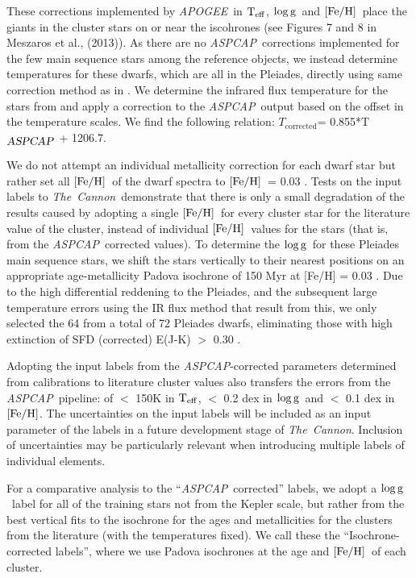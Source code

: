 \documentclass[12pt, preprint]{aastex}
\newcommand{\teff}{\mbox{$\rm T_{eff}$}}
\newcommand{\feh}{\mbox{$\rm [Fe/H]$}}
\newcommand{\logg}{\mbox{$\rm \log g$}}
\newcommand{\tc}{\textsl{The~Cannon}}
\newcommand{\apogee}{\textsl{APOGEE}}
\newcommand{\aspcap}{\textsl{ASPCAP}}
\begin{document}
These corrections implemented by \apogee\ in \teff, \logg\ and  \feh\ place the giants in the cluster stars on or near the iscohrones (see Figures 7 and 8 in Meszaros et al., (2013)).  
As there are no \aspcap\ corrections implemented for the few main sequence stars among the reference objects, 
we instead determine temperatures for these dwarfs, which are all in the Pleiades, directly using same correction method 
as in \citet{Meszaros2013}. 
We determine the infrared flux temperature for the stars from \citet{gonzalez2009} and apply a correction to 
the \aspcap\ output based on the offset in the temperature scales. We find the following relation:
 $T_{\mbox{corrected}}$= 0.855*T$_{\mbox{\textit{\aspcap}}}$ + 1206.7.


We do not attempt an individual metallicity correction for each dwarf star but rather set all \feh\ of the dwarf spectra to \feh\ = 0.03 \citep{barrado2001}.
Tests on the input labels to \tc\ demonstrate that there is only a small degradation of the results caused by adopting a single \feh\ for every cluster star for the literature value of the cluster, instead of individual \feh\ values for the stars (that is, from the \aspcap\ corrected values). 
To determine the \logg\ for these Pleiades main sequence stars, we shift the stars vertically to their nearest positions on an appropriate age-metallicity Padova isochrone of 150 Myr at [Fe/H] = 0.03 \citep{girardi2000}. 
Due to the high differential reddening to the Pleiades, and the subsequent large temperature errors using the IR flux method that result from this, we only selected the 64 from a total of 72 Pleiades dwarfs, eliminating those with high extinction of SFD (corrected) E(J-K) $>$ 0.30 \citep{Schlafly2011}.

Adopting the input labels from the \aspcap-corrected parameters determined from calibrations to literature cluster values also transfers the errors from the \aspcap\ pipeline: of $<$ 150K in \teff,  $<$ 0.2 dex in \logg\ and $<$ 0.1 dex in \feh.   
The uncertainties on the input labels will be included as an input parameter of the labels in a future development stage of \tc. Inclusion of uncertainties may be particularly relevant when introducing multiple labels of individual elements. 

For a comparative analysis to the ``\aspcap\ corrected'' labels, we adopt a \logg\ label for all of the training stars not from the Kepler scale, but rather from the best vertical fits to the isochrone for the ages and metallicities for the clusters from the literature (with the temperatures fixed). 
We call these the ``Isochrone-corrected labels'', where we use Padova isochrones at the age and \feh\ of each cluster. 
\end{document}
